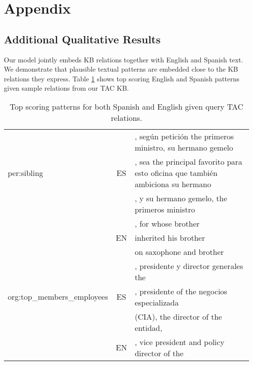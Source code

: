 \section{Appendix}

\subsection{Additional Qualitative Results}

Our model jointly embeds KB relations together with English and Spanish text. We demonstrate that plausible textual patterns are embedded close to the KB relations they express. Table \ref{tab:top-tac-patterns} shows top scoring English and Spanish patterns given sample relations from our TAC KB.

\begin{table}[h]
\begin{center}
\caption{Top scoring patterns for both Spanish and English given query TAC relations. \label{tab:top-tac-patterns}}
\begin{tabular}{|l|c|p{8.5cm}|}
\hline
 \multirow{3}{*}{per:sibling} &
   \multirow{3}{*}{ES} 	& 	\argOne, seg\'{u}n petici\'{o}n the primeros ministro, \endgraf \hspace{5pt} su hermano gemelo \argTwo  			\\ %
   &					&  	\argOne, sea the principal favorito para esto oficina que tambi\'{e}n \endgraf \hspace{5pt} ambiciona su hermano \argTwo 	\\%
   &					&  	\argOne, y su hermano gemelo, the primeros ministro \argTwo 	\\
\cline{2-3}
&   \multirow{3}{*}{EN} 	& 	\argOne, for whose brother \argTwo  		\\%
   &						&  	\argOne inherited his brother \argTwo 	\\%
   &						&  	\argOne on saxophone and brother \argTwo 	\\
\hline\hline
%
 \multirow{3}{*}{org:top\_members\_employees} &
   \multirow{3}{*}{ES} 	& 	\argTwo, presidente y director generales the \argOne  			\\%
   &					&  	\argTwo, presidente of the negocios especializada \argOne  	\\%
   &					&  	\argTwo (CIA), the director of the entidad, \argOne 	\\
\cline{2-3}
&   \multirow{3}{*}{EN} 	& 	\argTwo, vice president and policy director of the \argOne  		\\%

\end{tabular}
\end{center}
\end{table}
